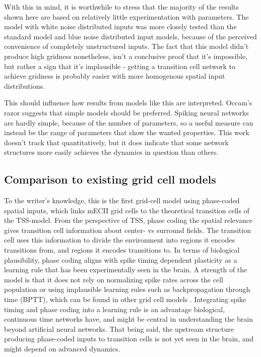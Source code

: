 \documentclass{article}
\begin{document}
    With this in mind, it is worthwhile to stress that the majority of the results shown here are based on relatively little experimentation with parameters. The model with white noise distributed inputs was more closely tested than the standard model and blue noise distributed input models, because of the perceived convenience of completely unstructured inputs. The fact that this model didn't produce high gridness nonetheless, isn't a conclusive proof that it's impossible, but rather a sign that it's implausible - getting a transition cell network to achieve gridness is probably easier with more homogenous spatial input distributions.

    This should influence how results from models like this are interpreted. Occam's razor suggests that simple models should be preferred. Spiking neural networks are hardly simple, because of the number of parameters, so a useful measure can instead be the range of parameters that show the wanted properties. This work doesn't track that quantitatively, but it does indicate that some network structures more easily achieves the dynamics in question than others.

    \subsection{Comparison to existing grid cell models} \label{Other model comparisons}

    To the writer's knowledge, this is the first grid-cell model using phase-coded spatial inputs, which links mECII grid cells to the theoretical transition cells of the TSS-model. From the perspective of TSS, phase coding the spatial relevance gives transition cell information about center- vs surround fields. The transition cell uses this information to divide the environment into regions it encodes transitions from, and regions it encodes transitions to. In terms of biological plausibility, phase coding aligns with spike timing dependent plasticity as a learning rule that has been experimentally seen in the brain. A strength of the model is that it does not rely on normalizing spike rates across the cell population or using implausible learning rules such as backpropagation through time (BPTT), which can be found in other grid cell models \parencite{Kropff2008,Sorscher2023}. Integrating spike timing and phase coding into a learning rule is an advantage biological, continuous time networks have, and might be central in understanding the brain beyond artificial neural networks. That being said, the upstream structure producing phase-coded inputs to transition cells is not yet seen in the brain, and might depend on advanced dynamics. 
\end{document}
